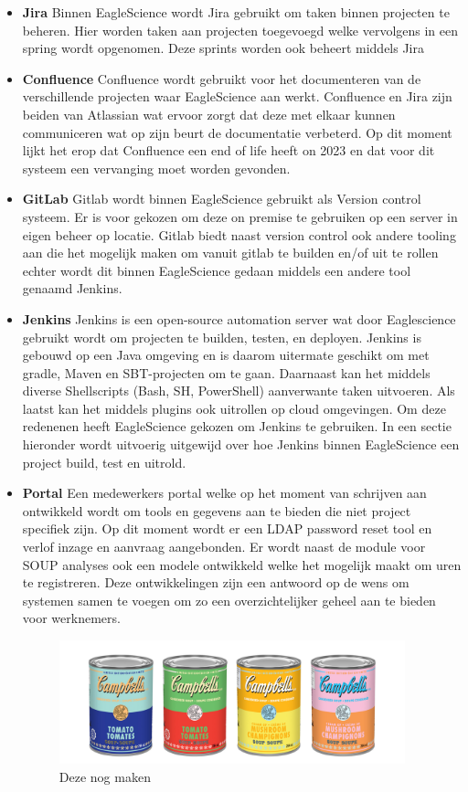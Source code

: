 \begin{itemize}
    \item \textbf{Jira} Binnen EagleScience wordt Jira gebruikt om taken binnen projecten te beheren. Hier worden taken aan projecten toegevoegd welke vervolgens in een spring wordt opgenomen. Deze sprints worden ook beheert middels Jira
    \item \textbf{Confluence}
    Confluence wordt gebruikt voor het documenteren van de verschillende projecten waar EagleScience aan werkt. Confluence en Jira zijn beiden van Atlassian wat ervoor zorgt dat deze met elkaar kunnen communiceren wat op zijn beurt de documentatie verbeterd. Op dit moment lijkt het erop dat Confluence een end of life heeft on 2023 en dat voor dit systeem een vervanging moet worden gevonden.
    \item \textbf{GitLab}
    Gitlab wordt binnen EagleScience gebruikt als Version control systeem. Er is voor gekozen om deze on premise te gebruiken op een server in eigen beheer op locatie. Gitlab biedt naast version control ook andere tooling aan die het mogelijk maken om vanuit gitlab te builden en/of uit te rollen echter wordt dit binnen EagleScience gedaan middels een andere tool genaamd Jenkins.
    \item \textbf{Jenkins}
    Jenkins is een open-source automation server wat door Eaglescience gebruikt wordt om projecten te builden, testen, en deployen. Jenkins is gebouwd op een Java omgeving en is daarom uitermate geschikt om met gradle, Maven en SBT-projecten om te gaan. Daarnaast kan het middels diverse Shellscripts (Bash, SH, PowerShell) aanverwante taken uitvoeren. Als laatst kan het middels plugins ook uitrollen op cloud omgevingen. Om deze redenenen heeft EagleScience gekozen om Jenkins te gebruiken. In een sectie hieronder wordt uitvoerig uitgewijd over hoe Jenkins binnen EagleScience een project build, test en uitrold.
    \item \textbf{Portal} Een medewerkers portal welke op het moment van schrijven aan ontwikkeld wordt om tools en gegevens aan te bieden die niet project specifiek zijn. Op dit moment wordt er een LDAP password reset tool en verlof inzage en aanvraag aangebonden. Er wordt naast de module voor SOUP analyses ook een modele ontwikkeld welke het mogelijk maakt om uren te registreren. Deze ontwikkelingen zijn een antwoord op de wens om systemen samen te voegen om zo een overzichtelijker geheel aan te bieden voor werknemers.

    \begin{figure}
        \centering
        \includegraphics[width=10cm]{gfx/soupcans}
        \caption{Deze nog maken}
        \label{fig:es-tooling}
    \end{figure}

\end{itemize}
